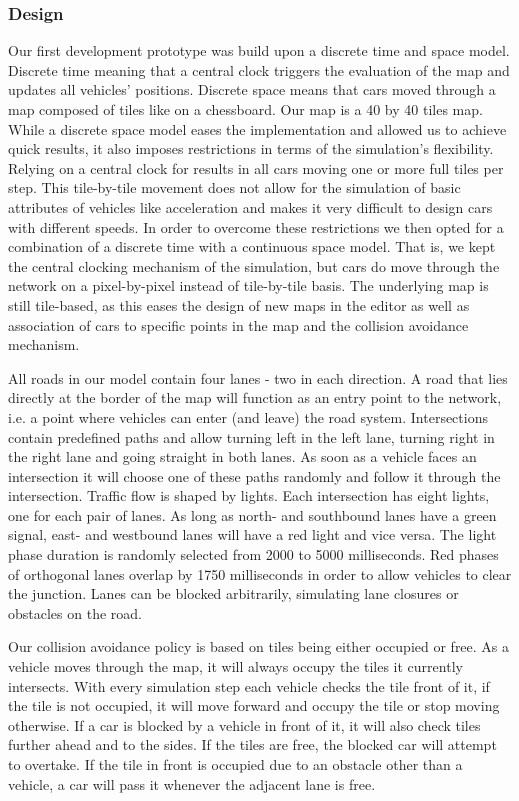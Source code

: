 \subsubsection{Design}
Our first development prototype was build upon a discrete time and space model. Discrete time meaning that a central clock triggers the evaluation of the map and updates all vehicles' positions. Discrete space means that cars moved through a map composed of tiles like on a chessboard. Our map is a  40 by 40 tiles map. While a discrete space model eases the implementation and allowed us to achieve quick results, it also imposes restrictions in terms of the simulation's flexibility. Relying on a central clock for results in all cars moving one or more full tiles per step. This tile-by-tile movement does not allow for the simulation of basic attributes of vehicles like acceleration and makes it very difficult to design cars with different speeds. In order to overcome these restrictions we then opted for a combination of a discrete time  with a continuous space model. That is, we kept the central clocking mechanism of the simulation, but cars do move through the network on a pixel-by-pixel instead of tile-by-tile basis. The underlying map is still tile-based, as this eases the design of new maps in the editor as well as association of cars to specific points in the map and the collision avoidance mechanism.

All roads in our model contain four lanes - two in each direction. A road that lies directly at the border of the map will function as an entry point to the network, i.e. a point where vehicles can enter (and leave) the road system. Intersections contain predefined paths and allow turning left in the left lane, turning right in the right lane and going straight in both lanes. As soon as a vehicle faces an intersection it will choose one of these paths randomly and follow it through the intersection. Traffic flow is shaped by lights. Each intersection has eight lights, one for each pair of lanes. As long as north- and southbound lanes have a green signal, east- and westbound lanes will have a red light and vice versa. The light phase duration is randomly selected from 2000 to 5000 milliseconds. Red phases of orthogonal lanes overlap by 1750 milliseconds in order to allow vehicles to clear the junction. Lanes can be blocked arbitrarily, simulating lane closures or obstacles on the road.

Our collision avoidance policy is based on tiles being either occupied or free. As a vehicle moves through the map, it will always occupy the tiles it currently intersects. With every simulation step each vehicle checks the tile front of it, if the tile is not occupied, it will move forward and occupy the tile or stop moving otherwise. If a car is blocked by a vehicle in front of it, it will also check tiles further ahead and to the sides. If the tiles are free, the blocked car will attempt to overtake. If the tile in front is occupied due to an obstacle other than a vehicle, a car will pass it whenever the adjacent lane is free.

